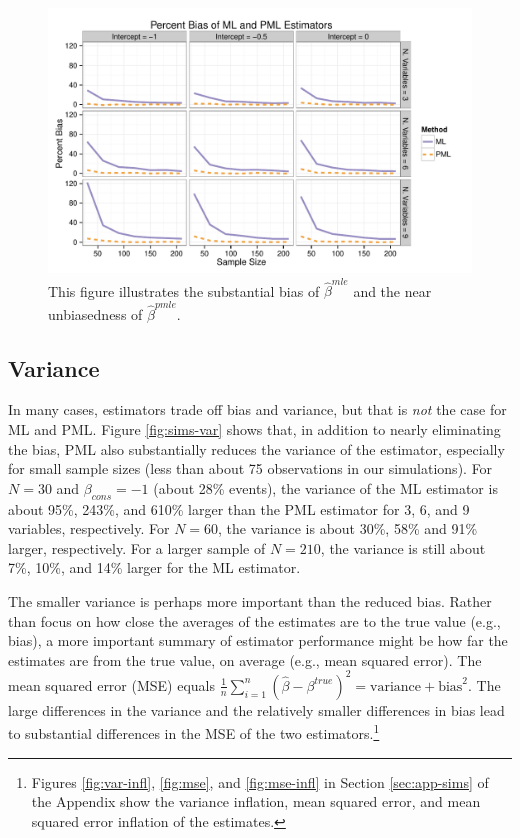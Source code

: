 \documentclass[12pt]{article}
\begin{document}
\begin{figure}[h]
\begin{center}
\includegraphics[width = \textwidth]{figs/sims-percent-bias.pdf}
\caption{This figure illustrates the substantial bias of $\hat{\beta}^{mle}$ and the near unbiasedness of $\hat{\beta}^{pmle}$.}\label{fig:sims-coef-perc-bias}
\end{center}
\end{figure}

\subsection*{Variance}

In many cases, estimators trade off bias and variance, but that is \textit{not} the case for ML and PML. 
Figure \ref{fig:sims-var} shows that, in addition to nearly eliminating the bias, PML also substantially reduces the variance of the estimator, especially for small sample sizes (less than about 75 observations in our simulations). 
For $N = 30$ and $\beta_{cons} = -1$ (about 28\% events), the variance of the ML estimator is about 95\%, 243\%, and 610\% larger than the PML estimator for 3, 6, and 9 variables, respectively. 
For $N = 60$, the variance is about 30\%, 58\% and 91\% larger, respectively. For a larger sample of $N = 210$, the variance is still about 7\%, 10\%, and 14\% larger for the ML estimator. 

The smaller variance is perhaps more important than the reduced bias.
Rather than focus on how close the averages of the estimates are to the true value (e.g., bias), a more important summary of estimator performance might be how far the estimates are from the true value, on average (e.g., mean squared error).
The mean squared error (MSE) equals $\frac{1}{n}\sum_{i=1}^n(\hat{\beta} - \beta^{true})^2 = \text{variance} + \text{bias}^2$.
The large differences in the variance and the relatively smaller differences in bias lead to substantial differences in the MSE of the two estimators.\footnote{Figures \ref{fig:var-infl}, \ref{fig:mse}, and \ref{fig:mse-infl} in Section \ref{sec:app-sims} of the Appendix show the variance inflation, mean squared error, and mean squared error inflation of the estimates.}
\end{document}
